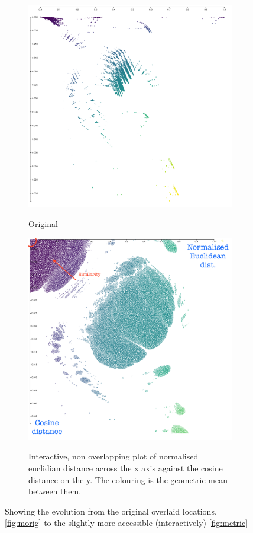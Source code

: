 \begin{figure}[H]
\begin{subfigure}{.5\textwidth}
  \centering
  \includegraphics[width=\textwidth]{fig/metric-1.png}
  \label{fig:morig}
  \caption{Original}
\end{subfigure}%
\begin{subfigure}{.5\textwidth}
\includegraphics[width=\textwidth]{fig/metric.png}
\label{fig:metric}
\caption{Interactive, non overlapping plot of normalised euclidian distance across the x axis against the cosine distance on the y. The colouring is the geometric mean between them.}
\end{subfigure}

\caption{Showing the evolution from the original overlaid locations, \autoref{fig:morig} to the slightly more accessible (interactively) \autoref{fig:metric}}
\end{figure}

